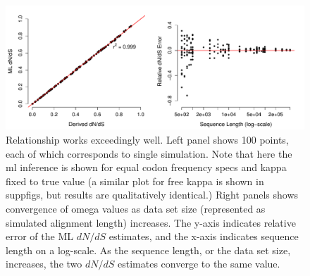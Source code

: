 \documentclass[11pt]{article}
\begin{document}
\begin{figure}[H]
\centerline{\includegraphics[width=6in]{figures/regression_convergence.pdf}}
\caption{\label{reg_conv} Relationship works exceedingly well. Left panel shows 100 points, each of which corresponds to single simulation. Note that here the ml inference is shown for equal codon frequency specs and kappa fixed to true value (a similar plot for free kappa is shown in suppfigs, but results are qualitatively identical.) Right panels shows convergence of omega values as data set size (represented as simulated alignment length) increases. The y-axis indicates relative error of the ML $dN/dS$ estimates, and the x-axis indicates sequence length on a log-scale. As the sequence length, or the data set size, increases, the two $dN/dS$ estimates converge to the same value. }
\end{figure}

	
	
	
\end{document}
